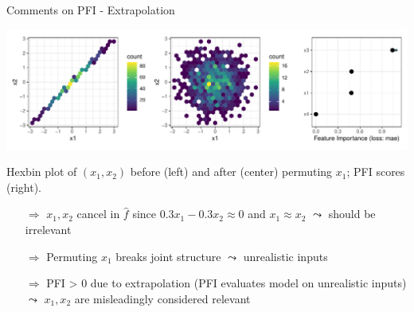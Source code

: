 \documentclass[11pt,compress,t,notes=noshow, aspectratio=169, xcolor=table]{beamer}
\begin{document}
\begin{frame}{Comments on PFI - Extrapolation}
\pause
\centerline{\includegraphics[width=\linewidth]{figure_man/pfi_hexbin_extrapolation.pdf}}

Hexbin plot of $(x_1, x_2)$ before (left) and after (center) permuting $x_1$;  
PFI scores (right).

\pause

\begin{itemize}
  \item[$\Rightarrow$] $x_1, x_2$ cancel in $\hat{f}$ since $0.3 x_1 - 0.3 x_2 \approx 0$ and $x_1 \approx x_2$ $\leadsto$ should be irrelevant
  \item[$\Rightarrow$] Permuting $x_1$ breaks joint structure $\leadsto$ unrealistic inputs
  \item[$\Rightarrow$] PFI > 0 due to extrapolation (PFI evaluates model on unrealistic inputs)\\ $\leadsto$ $x_1, x_2$ are misleadingly considered relevant
\end{itemize}

\end{frame}
\end{document}
